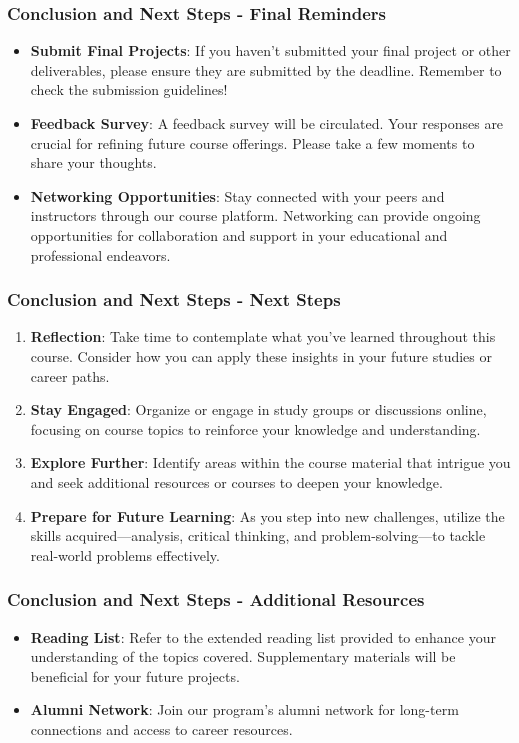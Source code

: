 \documentclass[aspectratio=169]{beamer}
\begin{document}
\begin{frame}[fragile]
    \frametitle{Conclusion and Next Steps - Final Reminders}
    \begin{itemize}
        \item \textbf{Submit Final Projects}: If you haven't submitted your final project or other deliverables, please ensure they are submitted by the deadline. Remember to check the submission guidelines!
        \item \textbf{Feedback Survey}: A feedback survey will be circulated. Your responses are crucial for refining future course offerings. Please take a few moments to share your thoughts.
        \item \textbf{Networking Opportunities}: Stay connected with your peers and instructors through our course platform. Networking can provide ongoing opportunities for collaboration and support in your educational and professional endeavors.
    \end{itemize}
\end{frame}

\begin{frame}[fragile]
    \frametitle{Conclusion and Next Steps - Next Steps}
    \begin{enumerate}
        \item \textbf{Reflection}: Take time to contemplate what you’ve learned throughout this course. Consider how you can apply these insights in your future studies or career paths.
        \item \textbf{Stay Engaged}: Organize or engage in study groups or discussions online, focusing on course topics to reinforce your knowledge and understanding.
        \item \textbf{Explore Further}: Identify areas within the course material that intrigue you and seek additional resources or courses to deepen your knowledge.
        \item \textbf{Prepare for Future Learning}: As you step into new challenges, utilize the skills acquired—analysis, critical thinking, and problem-solving—to tackle real-world problems effectively.
    \end{enumerate}
\end{frame}

\begin{frame}[fragile]
    \frametitle{Conclusion and Next Steps - Additional Resources}
    \begin{itemize}
        \item \textbf{Reading List}: Refer to the extended reading list provided to enhance your understanding of the topics covered. Supplementary materials will be beneficial for your future projects.
        \item \textbf{Alumni Network}: Join our program's alumni network for long-term connections and access to career resources.
    \end{itemize}
\end{frame}
\end{document}
